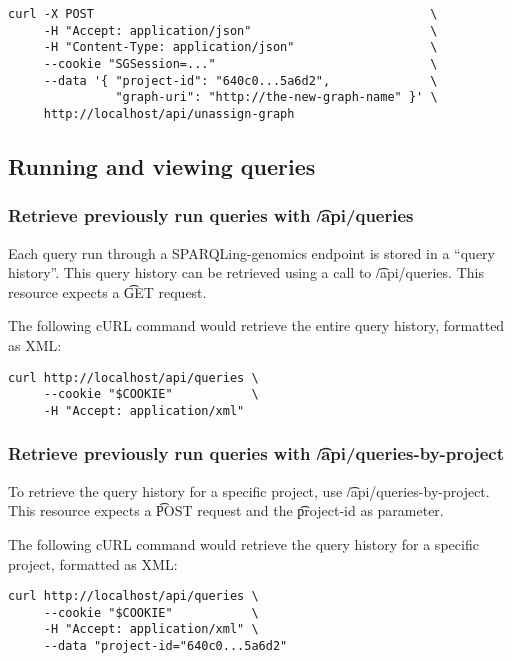 \begin{lstlisting}
curl -X POST                                               \
     -H "Accept: application/json"                         \
     -H "Content-Type: application/json"                   \
     --cookie "SGSession=..."                              \
     --data '{ "project-id": "640c0...5a6d2",              \
               "graph-uri": "http://the-new-graph-name" }' \
     http://localhost/api/unassign-graph
\end{lstlisting}

\pagebreak{}
\subsection{Running and viewing queries}

\subsubsection{Retrieve previously run queries with \t{/api/queries}}

  Each query run through a SPARQLing-genomics endpoint is stored in
  a ``query history''.  This query history can be retrieved using a
  call to \t{/api/queries}.  This resource expects a \t{GET} request.

  The following cURL command would retrieve the entire query history, formatted
  as XML:

\begin{lstlisting}
curl http://localhost/api/queries \
     --cookie "$COOKIE"           \
     -H "Accept: application/xml"
\end{lstlisting}

\subsubsection{Retrieve previously run queries with \t{/api/queries-by-project}}

  To retrieve the query history for a specific project, use \t{/api/queries-by-project}.
  This resource expects a \t{POST} request and the \t{project-id} as parameter.

  The following cURL command would retrieve the query history for a specific
  project, formatted as XML:

\begin{lstlisting}
curl http://localhost/api/queries \
     --cookie "$COOKIE"           \
     -H "Accept: application/xml" \
     --data "project-id="640c0...5a6d2"
\end{lstlisting}

